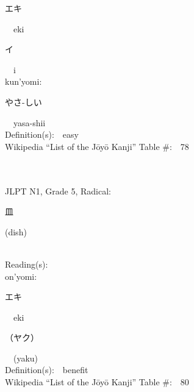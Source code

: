 \begin{multicols}{2}
{\hspace*{2em}}{\begin{CJK}{UTF8}{min} エキ \end{CJK}}\ \ eki\ \ \\
{\hspace*{2em}}{\begin{CJK}{UTF8}{min} イ \end{CJK}}\ \ i\ \ \\
{\hspace*{1em}}kun'yomi:\ \ \\
{\hspace*{2em}}{\begin{CJK}{UTF8}{min} やさ-しい \end{CJK}}\ \ yasa-shii\ \ \\
Definition(s):\ \ easy \\
Wikipedia ``List of the J\=oy\=o Kanji'' Table \#:\ \ 78 \\
\ \ \\
{\fontsize{34pt}{40pt}  }\ \ \\  %
{JLPT N1, Grade 5, Radical:\ \ {\begin{CJK}{UTF8}{min} 皿 \end{CJK}} (dish) } \\
Reading(s):\ \ \\
{\hspace*{1em}}on'yomi:\ \ \\
{\hspace*{2em}}{\begin{CJK}{UTF8}{min} エキ \end{CJK}}\ \ eki\ \ \\
{\hspace*{2em}}{\begin{CJK}{UTF8}{min} （ヤク） \end{CJK}}\ \ (yaku)\ \ \\
Definition(s):\ \ benefit \\
Wikipedia ``List of the J\=oy\=o Kanji'' Table \#:\ \ 80 \\
\ \ \\
{\fontsize{34pt}{40pt}  }\ \ \\  %

\end{multicols}
